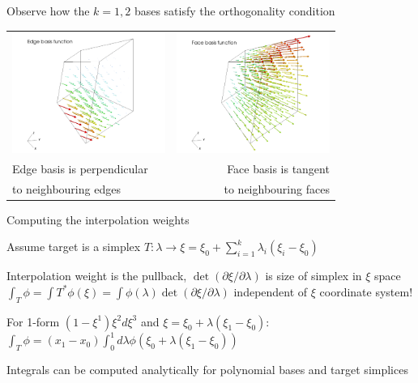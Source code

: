 \documentclass[aspectratio=169]{beamer}
\begin{document}
\begin{frame}[fragile]{Observe how the $k = 1, 2$ bases satisfy the orthogonality condition}

  \begin{tabular}{lr}
      \includegraphics[width=50mm]{hexEdge.png} &                        \includegraphics[width=50mm]{hexFace.png} \\
      {Edge basis is perpendicular } & {Face basis is tangent }  \\
      {to neighbouring edges} & {to neighbouring faces}
\end{tabular}


\end{frame}

\begin{frame}[fragile]{Computing the interpolation weights}

\begin{block}{Assume target is a simplex}
$T:\lambda \rightarrow \xi = \xi_0 + \sum_{i=1}^k \lambda_i(\xi_i - \xi_0)$
 \end{block}
\begin{block}{Interpolation weight is the pullback, $\det(\partial \xi/\partial \lambda)$ is size of simplex in $\xi$ space}
$\int_T \phi = \int T^* \phi(\xi) = \int \phi(\lambda) \det(\partial \xi/\partial \lambda)$ independent of $\xi$ coordinate system!
 \end{block}
\begin{block}{For 1-form $(1 - \xi^1)\xi^2d\xi^3$ and $\xi = \xi_0 + \lambda (\xi_1 - \xi_0)$:}
$\int_T \phi = (x_1 - x_0) \int_0^1 d\lambda \phi(\xi_0 + \lambda(\xi_1 - \xi_0))$
 \end{block}
 \begin{block}{Integrals can be computed analytically for polynomial bases and target simplices}
 \end{block}
\end{frame}
\end{document}
